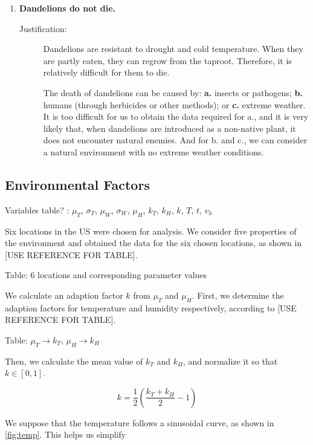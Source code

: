 \documentclass[12pt]{article}
\begin{document}
\begin{enumerate}
			\item \textbf{Dandelions do not die.}
			\vspace{-0.125in}
			\begin{description}
				\item[Justification:] Dandelions are resistant to drought and cold temperature.  When they are partly eaten, they can regrow from the taproot.  Therefore, it is relatively difficult for them to die.
				
				The death of dandelions can be caused by: \textbf{a.} insects or pathogens; \textbf{b.} humans (through herbicides or other methods); or \textbf{c.} extreme weather.  It is too difficult for us to obtain the data required for a., and it is very likely that, when dandelions are introduced as a non-native plant, it does not encounter natural enemies.  And for b. and c., we can consider a natural environment with no extreme weather conditions.  
			\end{description}
			
		\end{enumerate}
	
	\subsection{Environmental Factors}
	
		Variables table? : $\mu_T$, $\sigma_T$, $\mu_W$, $\sigma_W$, $\mu_H$, $k_T$, $k_H$, $k$, $T$, $t$, $v_h$
		
		Six locations in the US were chosen for analysis.  We consider five properties of the environment and obtained the data for the six chosen locations, as shown in [USE REFERENCE FOR TABLE].  
		
		Table: 6 locations and corresponding parameter values
		
		We calculate an adaption factor $k$ from $\mu_T$ and $\mu_H$.  First, we determine the adaption factors for temperature and humidity respectively, according to [USE REFERENCE FOR TABLE].
		
		Table: $\mu_T \to k_T$, $\mu_H \to k_H$
		
		Then, we calculate the mean value of $k_T$ and $k_H$, and normalize it so that $k \in [0, 1]$.
		
		\begin{equation}
			k = \frac12 \left( \frac{k_T + k_H}2 - 1 \right)
		\end{equation}
		
		We suppose that the temperature follows a sinusoidal curve, as shown in \ref{fig:temp}.  This helps us simplify 
		
\end{document}
